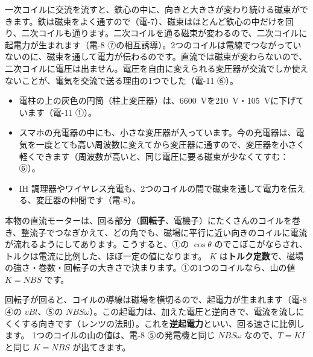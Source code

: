 一次コイルに交流を流すと、鉄心の中に、向きと大きさが変わり続ける磁束ができます。鉄は磁束をよく通すので（電-7）、磁束はほとんど鉄心の中だけを回り、二次コイルも通ります。二次コイルを通る磁束が変わるので、二次コイルに起電力が生まれます（電-8 ⑦の相互誘導）。2つのコイルは電線でつながっていないのに、磁束を通して電力が伝わるのです。直流では磁束が変わらないので、二次コイルに電圧は出ません。電圧を自由に変えられる変圧器が交流でしか使えないことが、電気を交流で送る理由の1つでした（電-11 ⑥）。

\begin{phmijika}[変圧器はあちこちにある]
\begin{itemize}[leftmargin=1.2\zw, itemsep=1pt, topsep=1pt, label={\color{phMijikaDeep}●}]
\item 電柱の上の灰色の円筒（柱上変圧器）は、\qty{6600}{V}を\qty{210}{V}・\qty{105}{V}に下げています（電-11 ①）。
\item スマホの充電器の中にも、小さな変圧器が入っています。今の充電器は、電気を一度とても高い周波数に変えてから変圧器に通すので、変圧器を小さく軽くできます（周波数が高いと、同じ電圧に要る磁束が少なくてすむ：⑥）。
\item IH 調理器やワイヤレス充電も、2つのコイルの間で磁束を通して電力を伝える、変圧器の仲間です（電-8）。
\end{itemize}
\end{phmijika}


\label{ph:電-12:sec3}
本物の直流モーターは、回る部分（\textbf{回転子}、電機子）にたくさんのコイルを巻き、整流子でつなぎかえて、どの角でも、磁場に平行に近い向きのコイルに電流が流れるようにしてあります。こうすると、①の $\cos\theta$ のでこぼこがならされ、トルクは電流に比例した、ほぼ一定の値になります。
$K$ は\textbf{トルク定数}で、磁場の強さ・巻数・回転子の大きさで決まります。①の1つのコイルなら、山の値 $K=NBS$ です。

回転子が回ると、コイルの導線は磁場を横切るので、起電力が生まれます（電-8 ④の $vBl$、⑤の $NBS\omega$）。この起電力は、加えた電圧と逆向きで、電流を流しにくくする向きです（レンツの法則）。これを\textbf{逆起電力}といい、回る速さに比例します。
1つのコイルの山の値は、電-8 ⑤の発電機と同じ $NBS\omega$ なので、$T=KI$ と同じ $K=NBS$ が出てきます。

